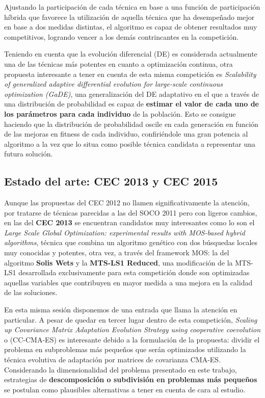 Ajustando la participación de cada técnica en base a una función de participación híbrida que favorece la utilización de aquella técnica que ha desempeñado mejor en base a dos medidas distintas, el algoritmo es capaz de obtener resultados muy competitivos, logrando vencer a los demás contrincantes en la competición.
 
Teniendo en cuenta que la evolución diferencial (DE)\cite{DE} es considerada actualmente una de las técnicas más potentes en cuanto a optimización continua, otra propuesta interesante a tener en cuenta de esta misma competición es \textit{Scalability of generalized adaptive differential evolution for large-scale continuous optimization (GaDE)}\cite{GaDE}, una generalización del DE adaptativo en el que a través de una distribución de probabilidad es capaz de \textbf{estimar el valor de cada uno de los parámetros para cada individuo} de la población. Esto se consigue haciendo que la distribución de probabilidad oscile en cada generación en función de las mejoras en fitness de cada individuo, confiriéndole una gran potencia al algoritmo a la vez que lo situa como posible técnica candidata a representar una futura solución.

\subsection{Estado del arte: CEC 2013 y CEC 2015}

Aunque las propuestas del CEC 2012 no llamen significativamente la atención, por tratarse de técnicas parecidas a las del SOCO 2011 pero con ligeros cambios, en las del \textbf{CEC 2013} se encuentran candidatos muy interesantes como lo son el \textit{Large Scale Global Optimization: experimental results with MOS-based hybrid algorithms}\cite{MOS2013}, técnica que combina un algoritmo genético con dos búsquedas locales muy conocidas y potentes, otra vez, a través del framework MOS: la del algoritmo \textbf{Solis Wets}\cite{SolisWets} y la \textbf{MTS-LS1 Reduced}, una modificación de la MTS-LS1\cite{MTS-LSGO} desarrollada exclusivamente para esta competición donde son optimizadas aquellas variables que contribuyen en mayor medida a una mejora en la calidad de las soluciones.

En esta misma sesión disponemos de una entrada que llama la atención en particular. A pesar de quedar en tercer lugar dentro de esta competición, \textit{Scaling up Covariance Matrix Adaptation Evolution Strategy using cooperative coevolution}\cite{CC-CMAES} o (CC-CMA-ES) es interesante debido a la formulación de la propuesta: dividir el problema en subproblemas más pequeños que serán optimizados utilizando la técnica evolutiva de adaptación por matrices de covarianza CMA-ES. Considerando la dimensionalidad del problema presentado en este trabajo, estrategias de \textbf{descomposición o subdivisión en problemas más pequeños} se postulan como plausibles alternativas a tener en cuenta de cara al estudio.

